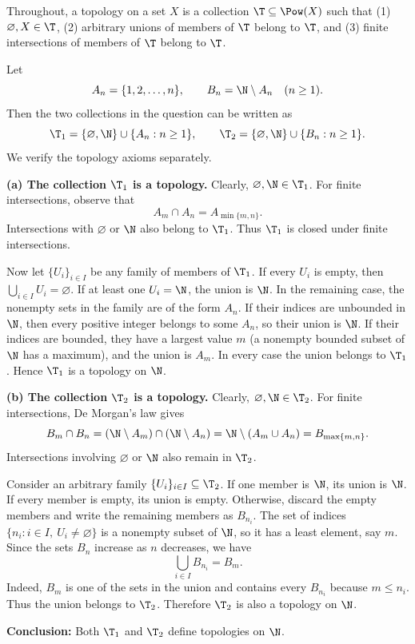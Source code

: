 
Throughout, a topology on a set $X$ is a collection $\T\subseteq\Pow(X)$ such that
(1) $\varnothing,X\in\T$, (2) arbitrary unions of members of $\T$ belong to $\T$, and
(3) finite intersections of members of $\T$ belong to $\T$.

Let
\[ A_n=\{1,2,\dots,n\},\qquad B_n=\N\setminus A_n\quad(n\ge1). \]
Then the two collections in the question can be written as
\[ \T_1=\{\varnothing,\N\}\cup\{A_n:n\ge1\},\qquad \T_2=\{\varnothing,\N\}\cup\{B_n:n\ge1\}. \]
We verify the topology axioms separately.

\textbf{(a) The collection $\T_1$ is a topology.} Clearly, $\varnothing,\N\in\T_1$. For finite
intersections, observe that
\[ A_m\cap A_n=A_{\min\{m,n\}}. \]
Intersections with $\varnothing$ or $\N$ also belong to $\T_1$. Thus $\T_1$ is closed under
finite intersections.

Now let $\{U_i\}_{i\in I}$ be any family of members of $\T_1$. If every $U_i$ is empty, then
$\bigcup_{i\in I}U_i=\varnothing$. If at least one $U_i=\N$, the union is $\N$. In the remaining
case, the nonempty sets in the family are of the form $A_n$. If their indices are unbounded in
$\N$, then every positive integer belongs to some $A_n$, so their union is $\N$. If their
indices are bounded, they have a largest value $m$ (a nonempty bounded subset of $\N$ has a
maximum), and the union is $A_m$. In every case the union belongs to $\T_1$. Hence $\T_1$ is a
topology on $\N$.

\textbf{(b) The collection $\T_2$ is a topology.} Clearly, $\varnothing,\N\in\T_2$. For finite
intersections, De Morgan's law gives
\[ B_m\cap B_n=(\N\setminus A_m)\cap(\N\setminus A_n)=\N\setminus(A_m\cup A_n)=B_{\max\{m,n\}}. \]
Intersections involving $\varnothing$ or $\N$ also remain in $\T_2$.

Consider an arbitrary family $\{U_i\}_{i\in I}\subseteq\T_2$. If one member is $\N$, its union
is $\N$. If every member is empty, its union is empty. Otherwise, discard the empty members and
write the remaining members as $B_{n_i}$. The set of indices
$\{n_i : i\in I,\ U_i\neq\varnothing\}$ is a nonempty subset of $\N$, so it has a least element,
say $m$. Since the sets $B_n$ increase as $n$ decreases, we have
\[ \bigcup_{i\in I}B_{n_i}=B_m. \]
Indeed, $B_m$ is one of the sets in the union and contains every $B_{n_i}$ because $m\le n_i$.
Thus the union belongs to $\T_2$. Therefore $\T_2$ is also a topology on $\N$.

\textbf{Conclusion:} Both $\T_1$ and $\T_2$ define topologies on $\N$.
